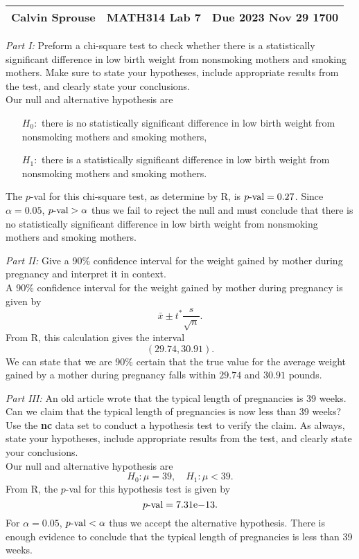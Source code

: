 \documentclass[a4paper, 12pt]{../../config/homework}
\begin{document}
\noindent
\begin{tabularx}{\textwidth}{>{\centering\arraybackslash}X>{\centering\arraybackslash}X>{\centering\arraybackslash}X}
Calvin Sprouse & MATH314 Lab 7 & Due 2023 Nov 29 1700\\\hline
\end{tabularx}

\noindent \textit{Part I:} Preform a chi-square test to check whether there is a statistically significant difference in low birth weight from nonsmoking mothers and smoking mothers. Make sure to state your hypotheses, include appropriate results from the test, and clearly state your conclusions.
\\Our null and alternative hypothesis are
\begin{enumerate}
\item[$H_0:$] there is no statistically significant difference in low birth weight from nonsmoking mothers and smoking mothers,
\item[$H_1:$] there is a statistically significant difference in low birth weight from nonsmoking mothers and smoking mothers.
\end{enumerate}
The $p$-val for this chi-square test, as determine by R, is $\text{$p$-val} = 0.27$.
Since $\alpha=0.05$, $\text{$p$-val}>\alpha$ thus we fail to reject the null and must conclude that there is no statistically significant difference in low birth weight from nonsmoking mothers and smoking mothers.

\vspace{2\singlelineheight} \noindent
\textit{Part II:} Give a 90\% confidence interval for the weight gained by mother during pregnancy and interpret it in context.
\\A 90\% confidence interval for the weight gained by mother during pregnancy is given by
\[\bar{x} \pm t^* \frac{s}{\sqrt{n}}.\]
From R, this calculation gives the interval
\[\left(29.74, 30.91\right).\]
We can state that we are 90\% certain that the true value for the average weight gained by a mother during pregnancy falls within $29.74$ and $30.91$ pounds.

\pagebreak \noindent
\textit{Part III:} An old article wrote that the typical length of pregnancies is 39 weeks. Can we claim that the typical length of pregnancies is now less than 39 weeks? Use the \textbf{nc} data set to conduct a hypothesis test to verify the claim. As always, state your hypotheses, include appropriate results from the test, and clearly state your conclusions.
\\Our null and alternative hypothesis are
\[H_0:\mu = 39, \quad H_1:\mu < 39.\]
From R, the $p$-val for this hypothesis test is given by
\[\text{$p$-val} = {7.31}\mathrm{e}{-13}.\]
For $\alpha = 0.05$, $\text{$p$-val} < \alpha$ thus we accept the alternative hypothesis. There is enough evidence to conclude that the typical length of pregnancies is less than 39 weeks.
\end{document}
